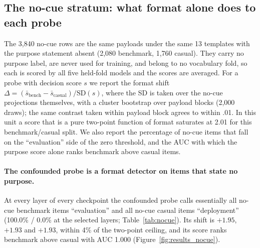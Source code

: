 \subsection{The no-cue stratum: what format alone does to each probe}
\label{sec:results_nocue}

The 3,840 no-cue rows are the same payloads under the same 13 templates with
the purpose statement absent (2,080 benchmark, 1,760 casual). They carry no
purpose label, are never used for training, and belong to no vocabulary fold,
so each is scored by all five held-fold models and the scores are averaged.
For a probe with decision score $s$ we report the format shift
$\Delta = (\bar{s}_{\mathrm{bench}} - \bar{s}_{\mathrm{casual}}) /
\mathrm{SD}(s)$, where the SD is taken over the no-cue projections themselves,
with a cluster bootstrap over payload blocks (2,000 draws); the same contrast
taken within payload block agrees to within .01. In this unit a score that is
a pure two-point function of format saturates at 2.01 for this
benchmark/casual split. We also report the percentage of no-cue items that
fall on the ``evaluation'' side of the zero threshold, and the AUC with which
the purpose score alone ranks benchmark above casual items.

\paragraph{The confounded probe is a format detector on items that state no purpose.}
At every layer of every checkpoint the confounded probe calls essentially all
no-cue benchmark items ``evaluation'' and all no-cue casual items
``deployment'' (100.0\% / 0.0\% at the selected layers;
Table~\ref{tab:nocue}). Its shift is $+1.95$, $+1.93$ and $+1.93$, within 4\%
of the two-point ceiling, and its score ranks benchmark above casual with AUC
1.000 (Figure~\ref{fig:results_nocue}).

